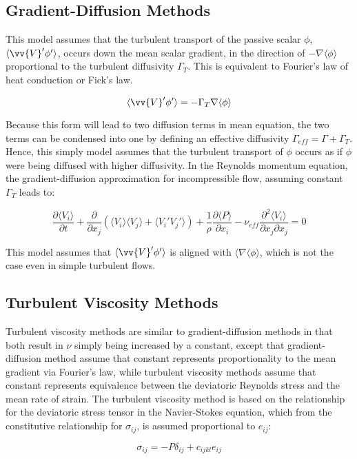 \documentclass[10pt]{article}
\newcommand{\beq}{\begin{equation}}
\newcommand{\eeq}{\end{equation}}
\newcommand{\la}{\langle}
\newcommand{\ra}{\rangle}
\begin{document}
\begin{flushleft}
\subsection{Gradient-Diffusion Methods}
This model assumes that the turbulent transport of the passive scalar \(\phi\), \(\la \vv{V}'\phi'\ra\), occurs down the mean scalar gradient, in the direction of \(-\nabla\la\phi\ra\) proportional to the turbulent diffusivity \(\Gamma_T\). This is equivalent to Fourier's law of heat conduction or Fick's law.

\beq
\la\vv{V}'\phi'\ra=-\Gamma_T\nabla\la\phi\ra
\eeq

Because this form will lead to two diffusion terms in mean equation, the two terms can be condensed into one by defining an effective diffusivity \(\Gamma_{eff}=\Gamma+\Gamma_T\). Hence, this simply model assumes that the turbulent transport of \(\phi\) occurs as if \(\phi\) were being diffused with higher diffusivity. In the Reynolds momentum equation, the gradient-diffusion approximation for incompressible flow, assuming constant \(\Gamma_T\) leads to:

\beq
\frac{\partial \la V_i\ra}{\partial t}+\frac{\partial}{\partial x_j}\left(\la V_i\ra\la V_j\ra+\la V_i'V_j'\ra\right)+\frac{1}{\rho}\frac{\partial \la P\ra}{\partial x_i}-\nu_{eff}\frac{\partial^2 \la V_i\ra}{\partial x_j\partial x_j}=0
\eeq

This model assumes that \(\la \vv{V}'\phi'\ra\) is aligned with \(\la\nabla\la\phi\ra\), which is not the case even in simple turbulent flows. 






\subsection{Turbulent Viscosity Methods}
Turbulent viscosity methods are similar to gradient-diffusion methods in that both result in \(\nu\) simply being increased by a constant, except that gradient-diffusion method assume that constant represents proportionality to the mean gradient via Fourier's law, while turbulent viscosity methods assume that constant represents equivalence between the deviatoric Reynolds stress and the mean rate of strain. The turbulent viscosity method is based on the relationship for the deviatoric stress tensor in the Navier-Stokes equation, which from the constitutive relationship for \(\sigma_{ij}\), is assumed proportional to \(e_{ij}\):

\beq
\sigma_{ij}=-P\delta_{ij}+c_{ijkl}e_{ij}
\eeq


\end{flushleft}
\end{document}
